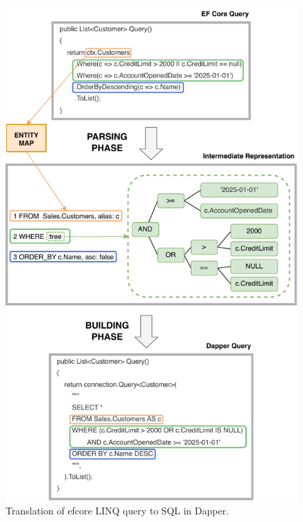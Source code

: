 \begin{figure}[!htp]
  \centering
  \includegraphics[scale=1]{thesis/img/thesis/05_parsing_building_queries.drawio.pdf}
  \caption{Translation of \acrshort{efcore} LINQ query to SQL in Dapper.}
  \label{fig:translation_complete}
\end{figure}